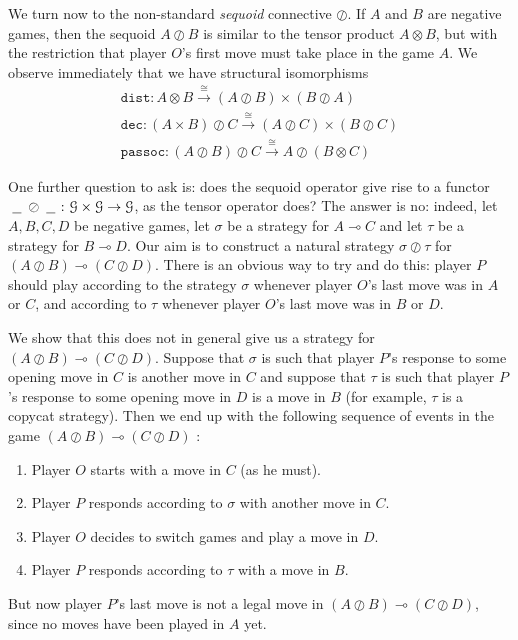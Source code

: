 \documentclass[a4paper,UKenglish]{lipics-v2016}
\theoremstyle{plain}
\theoremstyle{definition}
\newcommand*\from{\colon}
\newcommand{\tensor}{\otimes}
\newcommand{\sequoid}{\oslash}
\renewcommand{\implies}{\multimap}
\newcommand{\G}{\mathcal G}
\newcommand{\blank}{\;\underline{\hspace{1.5ex}}\;}
\newcommand{\toisom}{{\xrightarrow{\cong}}}
\newcommand{\passoc}{{\mathtt{passoc}}}
\newcommand{\dist}{{\mathtt{dist}}}
\newcommand{\dec}{{\mathtt{dec}}}
\newlength{\arrow}
\begin{document}
We turn now to the non-standard \emph{sequoid} connective $\sequoid$.  If $A$ and $B$ are negative games, then the sequoid $A\sequoid B$ is similar to the tensor product $A\tensor B$, but with the restriction that player $O$'s first move must take place in the game $A$.  We observe immediately that we have structural isomorphisms
\begin{gather*}
  \dist\from A\tensor B\toisom (A\sequoid B)\times(B\sequoid A)\\
  \dec\from(A\times B)\sequoid C\toisom (A\sequoid C)\times (B\sequoid C)\\
  \passoc\from (A\sequoid B)\sequoid C\toisom A\sequoid (B\tensor C)
\end{gather*}

One further question to ask is: does the sequoid operator give rise to a functor $\blank\sequoid\blank\from\G\times\G\to\G$, as the tensor operator does?  The answer is no: indeed, let $A,B,C,D$ be negative games, let $\sigma$ be a strategy for $A\implies C$ and let $\tau$ be a strategy for $B\implies D$.  Our aim is to construct a natural strategy $\sigma\sequoid\tau$ for $(A\sequoid B)\implies (C\sequoid D)$.  There is an obvious way to try and do this: player $P$ should play according to the strategy $\sigma$ whenever player $O$'s last move was in $A$ or $C$, and according to $\tau$ whenever player $O$'s last move was in $B$ or $D$.

We show that this does not in general give us a strategy for $(A\sequoid B)\implies (C\sequoid D)$.  Suppose that $\sigma$ is such that player $P$'s response to some opening move in $C$ is another move in $C$ and suppose that $\tau$ is such that player $P$'s response to some opening move in $D$ is a move in $B$ (for example, $\tau$ is a copycat strategy).  Then we end up with the following sequence of events in the game $(A\sequoid B)\implies(C\sequoid D)$  :
\begin{enumerate}
  \item Player $O$ starts with a move in $C$ (as he must).
  \item Player $P$ responds according to $\sigma$ with another move in $C$.
  \item Player $O$ decides to switch games and play a move in $D$.
  \item Player $P$ responds according to $\tau$ with a move in $B$.
\end{enumerate}

But now player $P$'s last move is not a legal move in $(A\sequoid B)\implies(C\sequoid D)$, since no moves have been played in $A$ yet.
\end{document}
